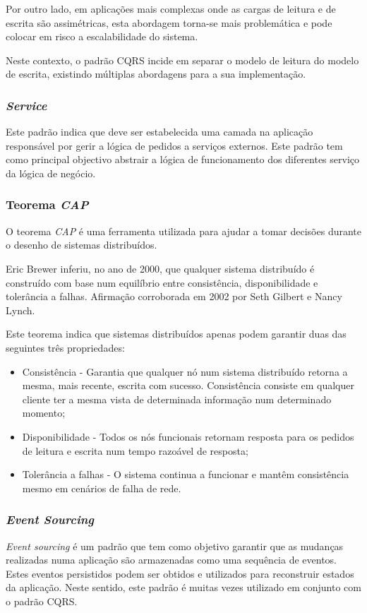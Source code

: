 Por outro lado, em aplicações mais complexas onde as cargas de leitura e de escrita são assimétricas, esta abordagem torna-se mais problemática e pode colocar em risco a escalabilidade do sistema.

Neste contexto, o padrão CQRS incide em separar o modelo de leitura do modelo de escrita, existindo múltiplas abordagens para a sua implementação\cite{cqrs}.

\subsubsection{\emph{Service} \label{service_pattern}}
Este padrão indica que deve ser estabelecida uma camada na aplicação responsável por gerir a lógica de pedidos a serviços externos. Este padrão tem como principal objectivo abstrair a lógica de funcionamento dos diferentes serviço da lógica de negócio\cite{service_design_patterns}.

\subsubsection{Teorema \emph{\acrfull{CAP}}} \label{cap_theorem}
O teorema \emph{\acrshort{CAP}} é uma ferramenta utilizada para ajudar a tomar decisões durante o desenho de sistemas distribuídos.

Eric Brewer inferiu, no ano de 2000, que qualquer sistema distribuído é construído com base num equilíbrio entre consistência, disponibilidade e tolerância a falhas. Afirmação corroborada em 2002 por Seth Gilbert e Nancy Lynch.

Este teorema indica que sistemas distribuídos apenas podem garantir duas das seguintes três propriedades\cite{cap_theorem}:

\begin{itemize}
    \item Consistência - Garantia que qualquer nó num sistema distribuído retorna a mesma, mais recente, escrita com sucesso. Consistência consiste em qualquer cliente ter a mesma vista de determinada informação num determinado momento;
    \item Disponibilidade - Todos os nós funcionais retornam resposta para os pedidos de leitura e escrita num tempo razoável de resposta;
    \item Tolerância a falhas - O sistema continua a funcionar e mantêm consistência mesmo em cenários de falha de rede.
\end{itemize}

\subsubsection{\emph{Event Sourcing} \label{event_sourcing}}
\emph{Event sourcing} é um padrão que tem como objetivo garantir que as mudanças realizadas numa aplicação são armazenadas como uma sequência de eventos. Estes eventos persistidos podem ser obtidos e utilizados para reconstruir estados da aplicação.
Neste sentido, este padrão é muitas vezes utilizado em conjunto com o padrão CQRS\cite{event_sourcing}.

